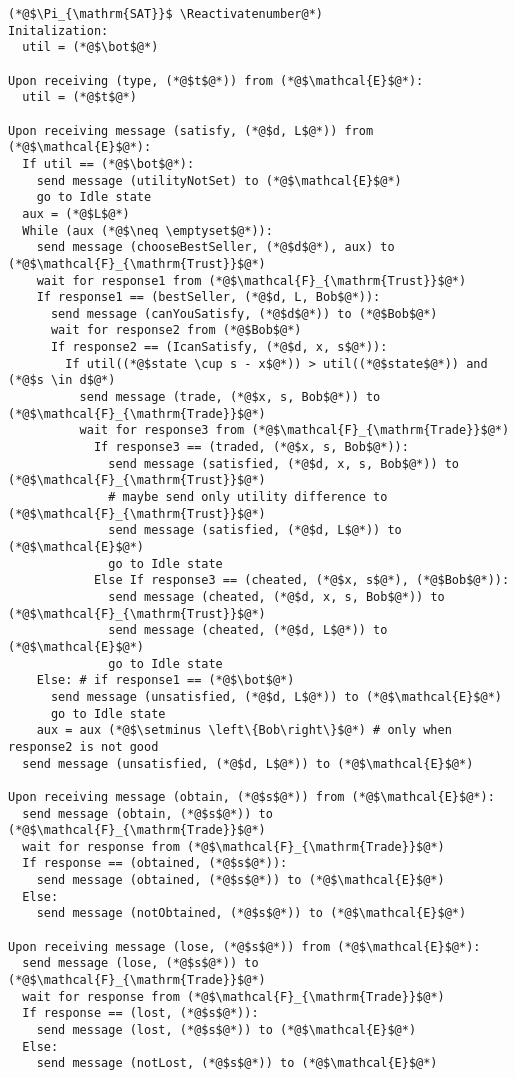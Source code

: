 \Suppressnumber
\begin{lstlisting}[label=satprot, style=numbers]
(*@$\Pi_{\mathrm{SAT}}$ \Reactivatenumber@*)
Initalization:
  util = (*@$\bot$@*)

Upon receiving (type, (*@$t$@*)) from (*@$\mathcal{E}$@*):
  util = (*@$t$@*)

Upon receiving message (satisfy, (*@$d, L$@*)) from (*@$\mathcal{E}$@*):
  If util == (*@$\bot$@*):
    send message (utilityNotSet) to (*@$\mathcal{E}$@*)
    go to Idle state
  aux = (*@$L$@*)
  While (aux (*@$\neq \emptyset$@*)):
    send message (chooseBestSeller, (*@$d$@*), aux) to (*@$\mathcal{F}_{\mathrm{Trust}}$@*)
    wait for response1 from (*@$\mathcal{F}_{\mathrm{Trust}}$@*)
    If response1 == (bestSeller, (*@$d, L, Bob$@*)):
      send message (canYouSatisfy, (*@$d$@*)) to (*@$Bob$@*)
      wait for response2 from (*@$Bob$@*)
      If response2 == (IcanSatisfy, (*@$d, x, s$@*)):
        If util((*@$state \cup s - x$@*)) > util((*@$state$@*)) and (*@$s \in d$@*)
          send message (trade, (*@$x, s, Bob$@*)) to (*@$\mathcal{F}_{\mathrm{Trade}}$@*)
          wait for response3 from (*@$\mathcal{F}_{\mathrm{Trade}}$@*)
            If response3 == (traded, (*@$x, s, Bob$@*)):
              send message (satisfied, (*@$d, x, s, Bob$@*)) to (*@$\mathcal{F}_{\mathrm{Trust}}$@*)
              # maybe send only utility difference to (*@$\mathcal{F}_{\mathrm{Trust}}$@*)
              send message (satisfied, (*@$d, L$@*)) to (*@$\mathcal{E}$@*)
              go to Idle state
            Else If response3 == (cheated, (*@$x, s$@*), (*@$Bob$@*)):
              send message (cheated, (*@$d, x, s, Bob$@*)) to (*@$\mathcal{F}_{\mathrm{Trust}}$@*)
              send message (cheated, (*@$d, L$@*)) to (*@$\mathcal{E}$@*)
              go to Idle state
    Else: # if response1 == (*@$\bot$@*)
      send message (unsatisfied, (*@$d, L$@*)) to (*@$\mathcal{E}$@*)
      go to Idle state
    aux = aux (*@$\setminus \left\{Bob\right\}$@*) # only when response2 is not good
  send message (unsatisfied, (*@$d, L$@*)) to (*@$\mathcal{E}$@*)

Upon receiving message (obtain, (*@$s$@*)) from (*@$\mathcal{E}$@*):
  send message (obtain, (*@$s$@*)) to (*@$\mathcal{F}_{\mathrm{Trade}}$@*)
  wait for response from (*@$\mathcal{F}_{\mathrm{Trade}}$@*)
  If response == (obtained, (*@$s$@*)):
    send message (obtained, (*@$s$@*)) to (*@$\mathcal{E}$@*)
  Else:
    send message (notObtained, (*@$s$@*)) to (*@$\mathcal{E}$@*)

Upon receiving message (lose, (*@$s$@*)) from (*@$\mathcal{E}$@*):
  send message (lose, (*@$s$@*)) to (*@$\mathcal{F}_{\mathrm{Trade}}$@*)
  wait for response from (*@$\mathcal{F}_{\mathrm{Trade}}$@*)
  If response == (lost, (*@$s$@*)):
    send message (lost, (*@$s$@*)) to (*@$\mathcal{E}$@*)
  Else:
    send message (notLost, (*@$s$@*)) to (*@$\mathcal{E}$@*)


\end{lstlisting}
